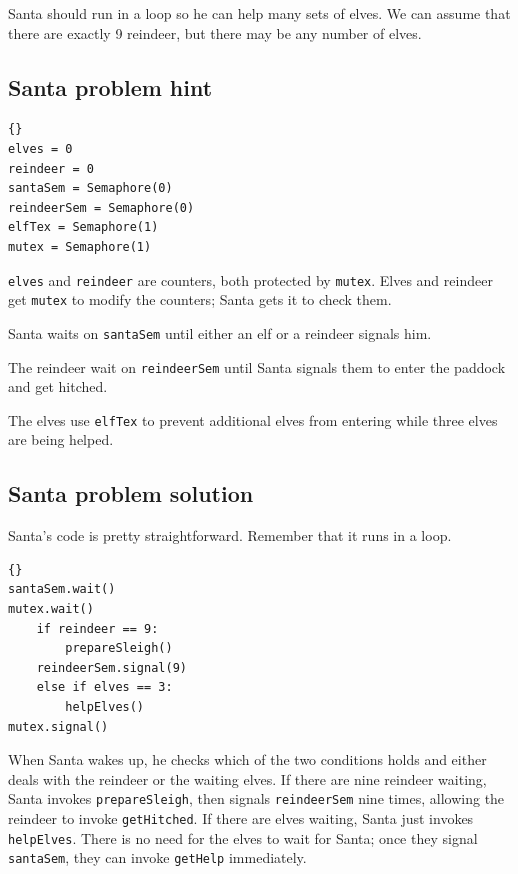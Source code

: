 \documentclass{book}
\newcommand{\clearemptydoublepage}{\newpage\cleardoublepage}
\begin{document}
Santa should run in a loop so he can help many sets of elves.
We can assume that there are exactly 9 reindeer, but there may
be any number of elves.  

\clearemptydoublepage
\subsection {Santa problem hint}

\begin{lstlisting}[caption={Santa problem hint}]{}
elves = 0
reindeer = 0
santaSem = Semaphore(0)
reindeerSem = Semaphore(0)
elfTex = Semaphore(1)
mutex = Semaphore(1)
\end{lstlisting}

{\tt elves} and {\tt reindeer} are counters, both protected
by {\tt mutex}.  Elves and reindeer get {\tt mutex} to modify the
counters; Santa gets it to check them.

Santa waits on {\tt santaSem} until either an elf or a reindeer
signals him.

The reindeer wait on {\tt reindeerSem} until Santa signals them to
enter the paddock and get hitched.

The elves use {\tt elfTex} to prevent additional elves from
entering while three elves are being helped.


\clearemptydoublepage
\subsection {Santa problem solution}

Santa's code is pretty straightforward.  Remember that it
runs in a loop.

\begin{lstlisting}[caption={Santa problem solution (Santa)}]{}
santaSem.wait()
mutex.wait()
    if reindeer == 9:
        prepareSleigh()
	reindeerSem.signal(9)
    else if elves == 3:
        helpElves()
mutex.signal()
\end{lstlisting}

When Santa wakes up, he checks which of the two conditions
holds and either deals with the reindeer or the waiting elves.
If there are nine reindeer waiting,
Santa invokes {\tt prepareSleigh}, then signals {\tt reindeerSem}
nine times, allowing the reindeer to invoke {\tt getHitched}.
If there are elves waiting, Santa just
invokes {\tt helpElves}.  There is no need for the elves to wait
for Santa; once they signal {\tt santaSem}, they can
invoke {\tt getHelp} immediately.
\end{document}
